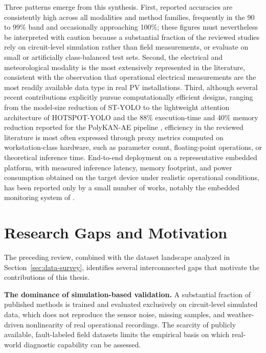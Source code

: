 Three patterns emerge from this synthesis. First, reported accuracies are consistently high across all modalities and method families, frequently in the 90 to 99\% band and occasionally approaching 100\%; these figures must nevertheless be interpreted with caution because a substantial fraction of the reviewed studies rely on circuit-level simulation rather than field measurements, or evaluate on small or artificially class-balanced test sets. Second, the electrical and meteorological modality is the most extensively represented in the literature, consistent with the observation that operational electrical measurements are the most readily available data type in real PV installations. Third, although several recent contributions explicitly pursue computationally efficient designs, ranging from the model-size reduction of ST-YOLO \citep{xie2024styolo} to the lightweight attention architecture of HOTSPOT-YOLO \citep{dhimish2025hotspot} and the 88\% execution-time and 40\% memory reduction reported for the PolyKAN-AE pipeline \citep{attouri_adaptive_2026}, efficiency in the reviewed literature is most often expressed through proxy metrics computed on workstation-class hardware, such as parameter count, floating-point operations, or theoretical inference time. End-to-end deployment on a representative embedded platform, with measured inference latency, memory footprint, and power consumption obtained on the target device under realistic operational conditions, has been reported only by a small number of works, notably the embedded monitoring system of \citet{costa2020sensors}.

\section{Research Gaps and Motivation}
\label{sec:gap}

The preceding review, combined with the dataset landscape analyzed in Section~\ref{sec:data-survey}, identifies several interconnected gaps that motivate the contributions of this thesis.

\textbf{The dominance of simulation-based validation.} A substantial fraction of published methods is trained and evaluated exclusively on circuit-level simulated data, which does not reproduce the sensor noise, missing samples, and weather-driven nonlinearity of real operational recordings. The scarcity of publicly available, fault-labeled field datasets limits the empirical basis on which real-world diagnostic capability can be assessed.

